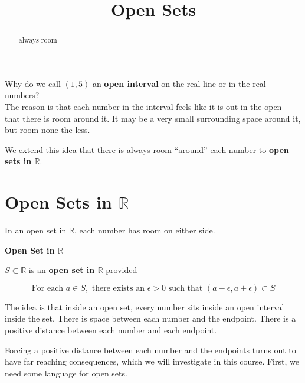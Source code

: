 \documentclass{ximera}
\title{Open Sets}
\begin{document}
\begin{abstract}
always room
\end{abstract}
\maketitle





Why do we call $(1, 5)$ an \textbf{open interval} on the real line or in the real numbers? \\



The reason is that each number in the interval feels like it is out in the open - that there is room around it.  It may be a very small surrounding space around it, but room none-the-less.  


We extend this idea that there is always room ``around'' each number to \textbf{open sets in $\mathbb{R}$}.






\section{Open Sets in $\mathbb{R}$}

In an open set in $\mathbb{R}$, each number has room on either side.  




\begin{definition}  \textbf{\textcolor{green!50!black}{Open Set in $\mathbb{R}$}}


$S \subset \mathbb{R}$ is an \textbf{open set in $\mathbb{R}$} provided 

\[
\text{For each } a \in S, \text{ there exists an } \epsilon > 0 \text{ such that }  (a - \epsilon, a + \epsilon) \subset S
\]

\end{definition}



\begin{idea}

The idea is that inside an open set, every number sits inside an open interval inside the set.  There is space between each number and the endpoint. There is a positive distance between each number and each endpoint.
\end{idea}

Forcing a positive distance between each number and the endpoints turns out to have far reaching consequences, which we will investigate in this course.  First, we need some language for open sets. \\
\end{document}
